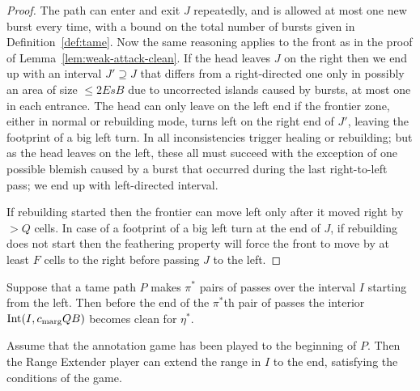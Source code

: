 \documentclass[11pt]{memoir}
\theoremstyle{definition} %
\renewcommand{\le}{\leq}
\def\B{B}
\newcommand{\E}{E} %
\newcommand{\F}{F}
\newcommand{\Int}{\mathrm{Int}} %
\newcommand{\passno}{\pi}
\newcommand{\Q}{Q} %
\newcommand{\s}{s} %
\newcommand{\cns}[1]{c_{\textrm{\upshape #1}}}
\newcommand{\CMarg}{\cns{marg}}
\begin{document}
\begin{proof}
  The path can enter and exit \( J \) repeatedly, and is allowed at most one new burst every time,
  with a bound on the total number of bursts given in Definition~\ref{def:tame}.
  Now the same reasoning applies to the front as in the proof of Lemma~\ref{lem:weak-attack-clean}.
  If the head leaves \( J \) on the right then we end up with an interval \( J'\supseteq J \)
  that differs from a right-directed one only in possibly an area of size \( \le 2\E\s\B \) due to
  uncorrected islands caused by bursts, at most one in each entrance.
  The head can only leave on the left end
  if the frontier zone, either in normal or rebuilding mode,
  turns left on the right end of \( J' \), leaving the footprint of a big left turn.
  In all inconsistencies trigger healing or rebuilding; but as the head leaves on the left,
  these all must succeed with the exception of one possible blemish caused by a burst
  that occurred during the last right-to-left pass; we end up with left-directed interval.

  If rebuilding started then the frontier can move left only after it moved right
  by \( >\Q \) cells.
  In case of a footprint of a big left turn at the end of \( J \), if rebuilding does not start then
  the feathering property will force the front to move by at least \( \F \) cells to the right before
  passing \( J \) to the left.
\end{proof}

\begin{lemma}\label{lem:weak-pass-clean}
  \begin{alphenum}
    \item Suppose that a tame path \( P \)
  makes \( \passno^{*} \) pairs of passes over the interval \( I \) starting from the left.
Then before the end of the \( \passno ^{*} \)th pair of passes the interior
\( \Int(I, \CMarg\Q\B) \) becomes clean for \( \eta^{*} \).
 \item\label{i:weak-pass-clean.game}
   Assume that the annotation game has been played to the beginning of \( P \).
   Then the Range Extender player can extend the range in \( I \) to the end,
   satisfying the conditions of the game.     
  \end{alphenum}
\end{lemma}
\end{document}
